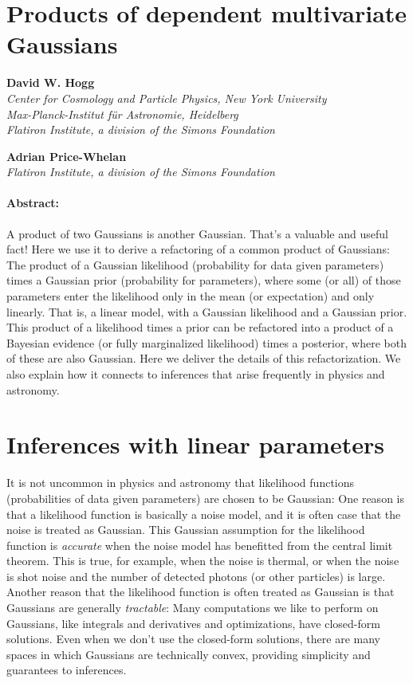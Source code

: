 \documentclass[12pt, letterpaper]{article}
\begin{document}
\section*{Products of dependent multivariate Gaussians}

\noindent
\textbf{David W. Hogg}\\
{\footnotesize%
  \textsl{Center for Cosmology and Particle Physics, New York University}\\
  \textsl{Max-Planck-Institut f\"ur Astronomie, Heidelberg}\\
  \textsl{Flatiron Institute, a division of the Simons Foundation}%
}

\noindent
\textbf{Adrian Price-Whelan}\\
{\footnotesize%
  \textsl{Flatiron Institute, a division of the Simons Foundation}%
}

\paragraph{Abstract:}
A product of two Gaussians is another Gaussian.
That's a valuable and useful fact!
Here we use it to derive a refactoring of a common product of
Gaussians:
The product of a Gaussian likelihood (probability for data given
parameters) times a Gaussian prior (probability for parameters),
where some (or all) of those parameters enter the likelihood
only in the mean (or expectation) and only linearly.
That is, a linear model, with a Gaussian likelihood and a Gaussian
prior.
This product of a likelihood times a prior can be refactored into a
product of a Bayesian evidence (or fully marginalized likelihood)
times a posterior, where both of these are also Gaussian.
Here we deliver the details of this refactorization.
We also explain how it connects to inferences that arise frequently in
physics and astronomy.

\section{Inferences with linear parameters}

It is not uncommon in physics and astronomy that likelihood functions
(probabilities of data given parameters) are chosen to be Gaussian:
One reason is that a likelihood function is basically a noise model,
and it is often case that the noise is treated as Gaussian.
This Gaussian assumption for the likelihood function is
\emph{accurate} when the noise model has benefitted from the central
limit theorem.
This is true, for example, when the noise is thermal, or when the
noise is shot noise and the number of detected photons (or other
particles) is large.
Another reason that the likelihood function is often treated as
Gaussian is that Gaussians are generally \emph{tractable}:
Many computations we like to perform on Gaussians, like integrals and
derivatives and optimizations, have closed-form solutions.
Even when we don't use the closed-form solutions, there are many
spaces in which Gaussians are technically convex, providing simplicity
and guarantees to inferences.
\end{document}

